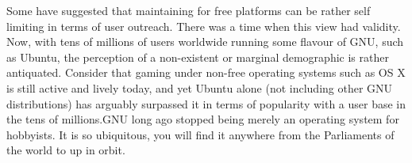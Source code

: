 Some have suggested that maintaining for free platforms can be rather self limiting in terms of user outreach. There was a time when this view had validity. Now, with tens of millions of users worldwide running some flavour of GNU, such as Ubuntu, the perception of a non-existent or marginal demographic  is rather antiquated. Consider that gaming under non-free operating systems such as OS X is still active and lively today, and yet Ubuntu alone (not including other GNU distributions) has arguably surpassed it in terms of popularity with a user base in the tens of millions. GNU long ago stopped being merely an operating system for hobbyists. It is so ubiquitous, you will find it anywhere from the Parliaments of the world to up in orbit.

\StopChapter

